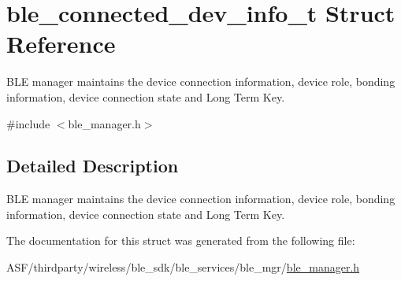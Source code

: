 \hypertarget{structble__connected__dev__info__t}{}\section{ble\+\_\+connected\+\_\+dev\+\_\+info\+\_\+t Struct Reference}
\label{structble__connected__dev__info__t}


B\+LE manager maintains the device connection information, device role, bonding information, device connection state and Long Term Key.  




{\ttfamily \#include $<$ble\+\_\+manager.\+h$>$}



\subsection{Detailed Description}
B\+LE manager maintains the device connection information, device role, bonding information, device connection state and Long Term Key. 

The documentation for this struct was generated from the following file\+:\begin{DoxyCompactItemize}
\item 
A\+S\+F/thirdparty/wireless/ble\+\_\+sdk/ble\+\_\+services/ble\+\_\+mgr/\mbox{\hyperlink{ble__manager_8h}{ble\+\_\+manager.\+h}}\end{DoxyCompactItemize}
